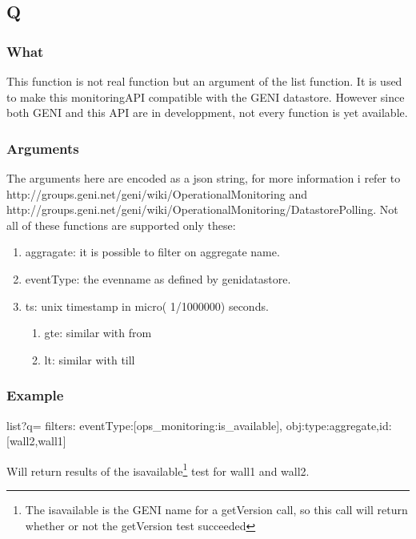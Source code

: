 \begin{otherlanguage}{english}
\subsection{Q}
\subsubsection{What}
This function is not real function but an argument of the list function. It is used to make this monitoringAPI compatible with the GENI datastore. However since both GENI and this API are in developpment, not every function is yet available.
\subsubsection{Arguments}
The arguments here are encoded as a json string, for more information i refer to http://groups.geni.net/geni/wiki/OperationalMonitoring and http://groups.geni.net/geni/wiki/OperationalMonitoring/DatastorePolling.
\npar
Not all of these functions are supported only these:
\begin{enumerate}
\item aggragate: it is possible to filter on aggregate name.
\item eventType: the evenname as defined by genidatastore. 
\item ts: unix timestamp in micro( 1/1000000) seconds.
\begin{enumerate}
\item gte: similar with from
\item lt: similar with till
\end{enumerate}
\end{enumerate}
\subsubsection{Example}
\begin{lt}
list?q={
  filters:{
    eventType:[ops_monitoring:is_available],
    obj:{type:aggregate,id:[wall2,wall1]}
  }
}
\end{lt}
Will return results of the is\textunderscore available\footnote{The is\textunderscore available is the GENI name for a getVersion call, so this call will return whether or not the getVersion test succeeded} test for wall1 and wall2.
\clearpage
\end{otherlanguage}
